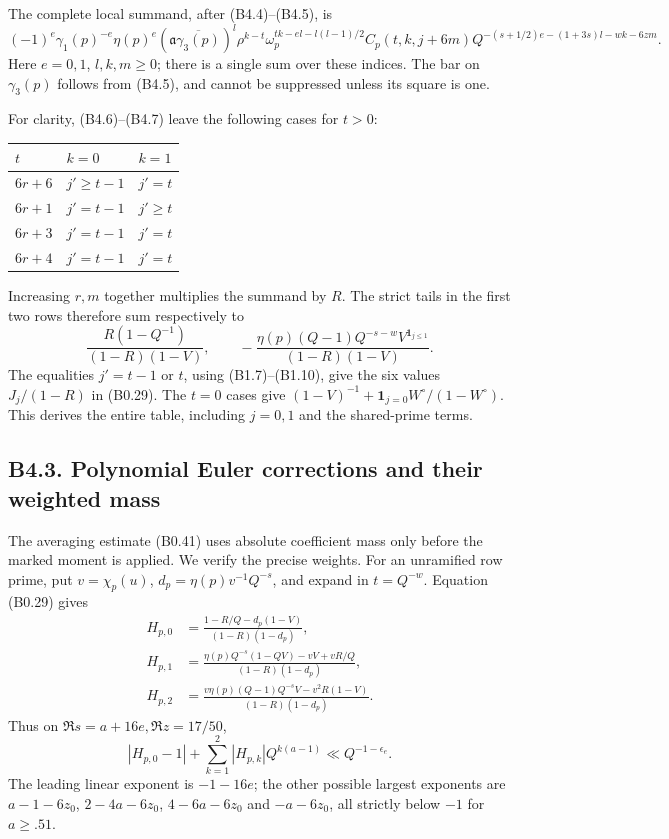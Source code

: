\documentclass[11pt,a4paper]{article}
\begin{document}
The complete local summand, after (B4.4)--(B4.5), is \[
(-1)^e\gamma_1(p)^{-e}\eta(p)^e
(\mathfrak a\overline{\gamma_3(p)})^l
\rho^{k-t}\omega_p^{tk-el-l(l-1)/2}
C_p(t,k,j+6m)
Q^{-(s+1/2)e-(1+3s)l-wk-6zm}.
\tag{B4.8}
\] Here \(e=0,\allowbreak{}1\), \(l,\allowbreak{}k,\allowbreak{}m\ge0\); there is a single sum over these
indices. The bar on \(\gamma_3(p)\) follows from (B4.5), and cannot be
suppressed unless its square is one.

For clarity, (B4.6)--(B4.7) leave the following cases for \(t>0\):

\begin{longtable}[]{@{}lll@{}}
\toprule\noalign{}
\(t\) & \(k=0\) & \(k=1\) \\
\midrule\noalign{}
\endhead
\bottomrule\noalign{}
\endlastfoot
\(6r+6\) & \(j'\ge t-1\) & \(j'=t\) \\
\(6r+1\) & \(j'=t-1\) & \(j'\ge t\) \\
\(6r+3\) & \(j'=t-1\) & \(j'=t\) \\
\(6r+4\) & \(j'=t-1\) & \(j'=t\) \\
\end{longtable}

Increasing \(r,\allowbreak{}m\) together multiplies the summand by \(R\). The strict
tails in the first two rows therefore sum respectively to \[
\frac{R(1-Q^{-1})}{(1-R)(1-V)},\qquad
-\frac{\eta(p)(Q-1)Q^{-s-w}V^{\mathbf1_{j\le1}}}{(1-R)(1-V)}.
\tag{B4.9}
\] The equalities \(j'=t-1\) or \(t\), using (B1.7)--(B1.10), give the
six values \(J_j/(1-R)\) in (B0.29). The \(t=0\) cases give
\((1-V)^{-1}+\mathbf1_{j=0}W^\circ/(1-W^\circ)\). This derives the
entire table, including \(j=0,\allowbreak{}1\) and the shared-prime terms.

\hypertarget{b4.3.-polynomial-euler-corrections-and-their-weighted-mass}{%
\subsection{B4.3. Polynomial Euler corrections and their weighted
mass}\label{b4.3.-polynomial-euler-corrections-and-their-weighted-mass}}

The averaging estimate (B0.41) uses absolute coefficient mass only
before the marked moment is applied. We verify the precise weights. For
an unramified row prime, put \(v=\chi_p(u)\),
\(d_p=\eta(p)v^{-1}Q^{-s}\), and expand in \(t=Q^{-w}\). Equation
(B0.29) gives \[
\begin{aligned}
H_{p,0}&=\frac{1-R/Q-d_p(1-V)}{(1-R)(1-d_p)},\\
H_{p,1}&=\frac{\eta(p)Q^{-s}(1-QV)-vV+vR/Q}{(1-R)(1-d_p)},\\
H_{p,2}&=\frac{v\eta(p)(Q-1)Q^{-s}V-v^2R(1-V)}{(1-R)(1-d_p)}.
\end{aligned}
\tag{B4.10}
\] Thus on \(\Re s=a+16e,\allowbreak{}\Re z=17/50\), \[
|H_{p,0}-1|+\sum_{k=1}^2|H_{p,k}|Q^{k(a-1)}\ll Q^{-1-\epsilon_e}.
\tag{B4.11}
\] The leading linear exponent is \(-1-16e\); the other possible largest
exponents are \(a-1-6z_0\), \(2-4a-6z_0\), \(4-6a-6z_0\) and
\(-a-6z_0\), all strictly below \(-1\) for \(a\ge.51\).
\end{document}
